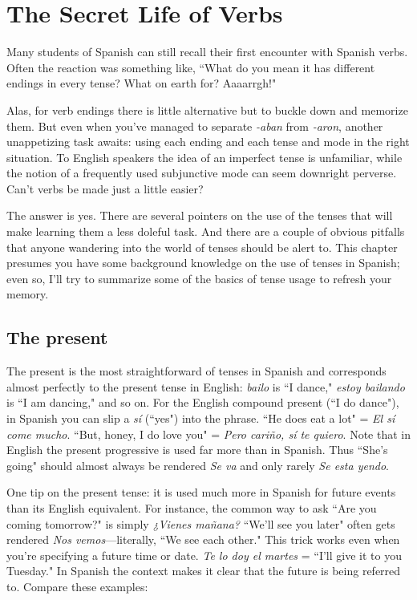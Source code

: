 \chapter{The Secret Life of Verbs}

Many students of Spanish can still recall their first encounter
with Spanish verbs. Often the reaction was something like, ``What do
you mean it has different endings in every tense? What on earth for?
Aaaarrgh!"

Alas, for verb endings there is little alternative but to buckle
down and memorize them. But even when you've managed to separate
\emph{-aban} from \emph{-aron}, another unappetizing task awaits: using each ending
and each tense and mode in the right situation. To English speakers
the idea of an imperfect tense is unfamiliar, while the notion of a frequently used subjunctive mode can seem downright perverse. Can't
verbs be made just a little easier?

The answer is yes. There are several pointers on the use of the
tenses that will make learning them a less doleful task. And there are
a couple of obvious pitfalls that anyone wandering into the world of
tenses should be alert to. This chapter presumes you have some background knowledge on the use of tenses in Spanish; even so, I'll try to
summarize some of the basics of tense usage to refresh your memory.

\section{The present}

The present is the most straightforward of tenses in Spanish
and corresponds almost perfectly to the present tense in English: \emph{bailo}
is ``I dance," \emph{estoy bailando} is ``I am dancing," and so on. For the English compound present (``I do dance"), in Spanish you can slip a \emph{sí}
(``yes") into the phrase. ``He does eat a lot" = \emph{El sí come mucho}. ``But,
honey, I do love you" = \emph{Pero cariño, sí te quiero}. Note that in English
the present progressive is used far more than in Spanish. Thus ``She's
going" should almost always be rendered \emph{Se va} and only rarely \emph{Se esta
	yendo}.

One tip on the present tense: it is used much more in Spanish
for future events than its English equivalent. For instance, the common way to ask ``Are you coming tomorrow?" is simply \emph{¿Vienes mañana?} ``We'll see you later" often gets rendered \emph{Nos vemos}---literally,
``We see each other." This trick works even when you're specifying a
future time or date. \emph{Te lo doy el martes} = ``I'll give it to you Tuesday."
In Spanish the context makes it clear that the future is being referred
to. Compare these examples:

